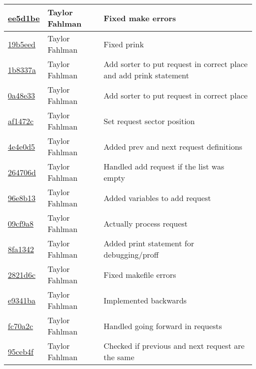 \begin{tabular}{l l l}
\href{https://github.com/fahlmant/cs444/commit/ee5d1be765a4359e795c1cfab79f45e7157dc427}{ee5d1be} & Taylor Fahlman & Fixed make errors\\\hline
\href{https://github.com/fahlmant/cs444/commit/19b5eed5fce8f0988d6de8e32433e71ec722f401}{19b5eed} & Taylor Fahlman & Fixed prink\\\hline
\href{https://github.com/fahlmant/cs444/commit/1b8337adbfd556c19331c13e47fdf30f6be4aa2c}{1b8337a} & Taylor Fahlman & Add sorter to put request in correct place and add prink statement\\\hline
\href{https://github.com/fahlmant/cs444/commit/0a48e33e7e336bcfa08225cb01f3df0fcaaed1f8}{0a48e33} & Taylor Fahlman & Add sorter to put request in correct place\\\hline
\href{https://github.com/fahlmant/cs444/commit/af1472c36acd59ba67588633806bf0893cfe8b8b}{af1472c} & Taylor Fahlman & Set request sector position\\\hline
\href{https://github.com/fahlmant/cs444/commit/4e4e0d50bb79cb0287dd9e15bf858950aca4e52c}{4e4e0d5} & Taylor Fahlman & Added prev and next request definitions\\\hline
\href{https://github.com/fahlmant/cs444/commit/264706d970dd72869b019450b1f75bc089303f51}{264706d} & Taylor Fahlman & Handled add request if the list was empty\\\hline
\href{https://github.com/fahlmant/cs444/commit/96e8b1364367fb70321afbf63863220dec0966bb}{96e8b13} & Taylor Fahlman & Added variables to add request\\\hline
\href{https://github.com/fahlmant/cs444/commit/09cf9a81142f457cc824439568eb4f7d0202b485}{09cf9a8} & Taylor Fahlman & Actually process request\\\hline
\href{https://github.com/fahlmant/cs444/commit/8fa13421d3f213f3e1698235bd37426b314838d6}{8fa1342} & Taylor Fahlman & Added print statement for debugging/proff\\\hline
\href{https://github.com/fahlmant/cs444/commit/2821d6ce67d5d1a5051838079defe48c4f14ee9f}{2821d6c} & Taylor Fahlman & Fixed makefile errors\\\hline
\href{https://github.com/fahlmant/cs444/commit/e9341bad2ae0d815c1eddedcb0070bb99c3ae231}{e9341ba} & Taylor Fahlman & Implemented backwards\\\hline
\href{https://github.com/fahlmant/cs444/commit/fc70a2c72e4933dbf271bf6f5b4adc250cd93f0b}{fc70a2c} & Taylor Fahlman & Handled going forward in requests\\\hline
\href{https://github.com/fahlmant/cs444/commit/95ceb4f9438107951331d241099b020416a2e580}{95ceb4f} & Taylor Fahlman & Checked if previous and next request are the same\\\hline

\end{tabular}

